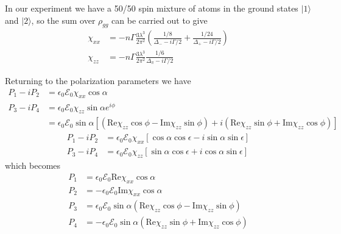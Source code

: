 \documentclass[11pt,letter]{article}
\newcommand{\efieldo}{\ensuremath{\mathcal{E}_{0}}}
\begin{document}
In our experiment we have a 50/50 spin mixture of atoms in the ground states
$|1\rangle$ and $|2\rangle$,  so the sum over $\rho_{gg}$ can be carried out to
give 
\begin{equation}
\begin{split}
   \chi_{xx} & = - n  
       \Gamma\frac{ 3  \lambda^{3}}{2 \pi^{2}} 
       \left( \frac{1/8}{\Delta_{-} - i \Gamma/2 } 
       +  
              \frac{1/24}{\Delta_{+} - i \Gamma/2 }  
       \right)  \\
   \chi_{zz} & = - n
       \Gamma\frac{ 3 \lambda^{3}}{2 \pi^{2}} 
              \frac{1/6}{\Delta_{\pi} - i \Gamma/2 } 
\end{split}
\end{equation}

Returning to the polarization parameters we have 
\begin{equation}
\begin{split}
  P_{1} - i P_{2} & = \epsilon_{0} \efieldo \chi_{xx} \cos\alpha \\
  P_{3} - i P_{4} & = \epsilon_{0} \efieldo \chi_{zz} \sin\alpha e^{i\phi} \\
      & =   \epsilon_{0}\efieldo \sin\alpha \left[
            (\text{Re}\chi_{zz} \cos\phi - \text{Im}\chi_{zz}\sin\phi ) 
          +i(\text{Re}\chi_{zz} \sin\phi + \text{Im}\chi_{zz}\cos\phi ) \right]
\end{split}
\end{equation}
\begin{equation}
\begin{split}
  P_{1} - i P_{2} & = \epsilon_{0} \efieldo \chi_{xx}
      [\cos\alpha \cos \epsilon - i \sin\alpha\sin\epsilon] \\
  P_{3} - i P_{4} & = \epsilon_{0} \efieldo \chi_{zz} 
      [\sin\alpha \cos\epsilon + i \cos\alpha\sin\epsilon]
\end{split}
\end{equation}
which becomes
\begin{equation}
\begin{split}
  P_{1} &= \epsilon_{0} \efieldo \text{Re}\chi_{xx} \cos\alpha \\
  P_{2} &= -\epsilon_{0} \efieldo \text{Im}\chi_{xx} \cos\alpha \\ 
  P_{3} &= \epsilon_{0} \efieldo \sin\alpha 
            (\text{Re}\chi_{zz} \cos\phi - \text{Im}\chi_{zz}\sin\phi ) \\ 
  P_{4} &= -\epsilon_{0} \efieldo \sin\alpha
          (\text{Re}\chi_{zz} \sin\phi + \text{Im}\chi_{zz}\cos\phi ) \\ 
\end{split}
\end{equation}
\end{document}
